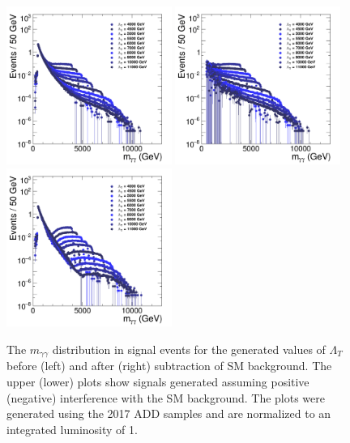 \begin{figure}[htbp!]
\begin{center}
\caption{The $m_{\gamma\gamma}$ distribution in signal events for the generated values of $\Lambda_T$ before (left) and after (right) subtraction of SM background. The upper (lower) plots show signals generated assuming positive (negative) interference with the SM background. The plots were generated using the 2017 ADD samples and are normalized to an integrated luminosity of 1\fbinv.}
\includegraphics[angle=0,width=0.48\textwidth]{fig/ADDGravToGG_NED-2017_KK-1-1.png}
\includegraphics[angle=0,width=0.48\textwidth]{fig/ADDGravToGG_NED-2017_KK-1_bkg_sub-1.png}
\includegraphics[angle=0,width=0.48\textwidth]{fig/ADDGravToGG_NED-2017_KK-0-1.png}

\end{center}
\end{figure}
